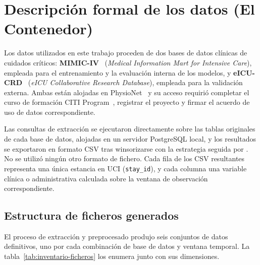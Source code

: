 \documentclass[
  spanish,
  a4paper,
  12pt,
  twoside]{memoir}
\begin{document}
\section{Descripción formal de los datos (El Contenedor)}

Los datos utilizados en este trabajo proceden de dos bases de datos clínicas de cuidados críticos: \textbf{MIMIC-IV}~\cite{johnson2023} (\textit{Medical Information Mart for Intensive Care}), empleada para el entrenamiento y la evaluación interna de los modelos, y \textbf{eICU-CRD}~\cite{pollard2018} (\textit{eICU Collaborative Research Database}), empleada para la validación externa. Ambas están alojadas en PhysioNet~\cite{physionet} y su acceso requirió completar el curso de formación CITI Program~\cite{citiprogram}, registrar el proyecto y firmar el acuerdo de uso de datos correspondiente.
 
Las consultas de extracción se ejecutaron directamente sobre las tablas originales de cada base de datos, alojadas en un servidor PostgreSQL local, y los resultados se exportaron en formato CSV tras winsorizarse con la estrategia seguida por \cite{gupta2022mimic}. No se utilizó ningún otro formato de fichero. Cada fila de los CSV resultantes representa una única estancia en UCI (\texttt{stay\_id}), y cada columna una variable clínica o administrativa calculada sobre la ventana de observación correspondiente.
 
\subsection*{Estructura de ficheros generados}
 
El proceso de extracción y preprocesado produjo seis conjuntos de datos definitivos, uno por cada combinación de base de datos y ventana temporal. La tabla~\ref{tab:inventario-ficheros} los enumera junto con sus dimensiones.
 
\begin{table}[htbp]
  \centering
  \caption{Inventario de los ficheros CSV definitivos.}
  \label{tab:inventario-ficheros}
\end{table}
 
\end{document}
